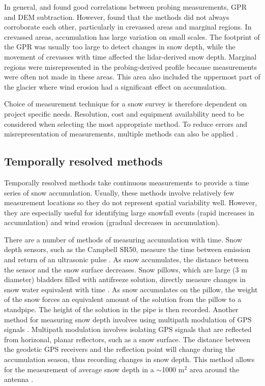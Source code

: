 \documentclass{sfuthesis}
\begin{document}
\begin{appendices}
In general, \cite{Machguth2006} and \cite{Sold2013} found good correlations between probing measurements, GPR and DEM subtraction. However, \cite{Sold2013} found that the methods did not always corroborate each other, particularly in crevassed areas and marginal regions. In crevassed areas, accumulation has large variation on small scales. The footprint of the GPR was usually too large to detect changes in snow depth, while the movement of crevasses with time affected the lidar-derived snow depth. Marginal regions were misrepresented in the probing-derived profile because measurements were often not made in these areas. This area also included the uppermost part of the glacier where wind erosion had a significant effect on accumulation. 

Choice of measurement technique for a snow survey is therefore dependent on project specific needs. Resolution, cost and equipment availability need to be considered when selecting the most appropriate method. To reduce errors and misrepresentation of measurements, multiple methods can also be applied \citep{Machguth2006}. 

\subsection{Temporally resolved methods}
Temporally resolved methods take continuous measurements to provide a time series of snow accumulation. Usually, these methods involve relatively few measurement locations so they do not represent spatial variability well. However, they are especially useful for identifying large snowfall events (rapid increases in accumulation) and wind erosion (gradual decreases in accumulation). 

There are a number of methods of measuring accumulation with time. Snow depth sensors, such as the Campbell SR50, measure the time between emission and return of an ultrasonic pulse \citep{Ryan2008}. As snow accumulates, the distance between the sensor and the snow surface decreases. Snow pillows, which are large (3 m diameter) bladders filled with antifreeze solution, directly measure changes in snow water equivalent with time \citep{Archer1995}. As snow accumulates on the pillow, the weight of the snow forces an equivalent amount of the solution from the pillow to a standpipe. The height of the solution in the pipe is then recorded. Another method for measuring snow depth involves using multipath modulation of GPS signals \citep{Larson2009,McCreight2014}. Multipath modulation involves isolating GPS signals that are reflected from horizonal, planar reflectors, such as a snow surface. The distance between the geodetic GPS receivers and the reflection point will change during the accumulation season, thus recording changes in snow depth. This method allows for the measurement of average snow depth in a $\sim$1000 m$^2$ area around the antenna \citep{McCreight2014}.


\end{appendices}
\end{document}
